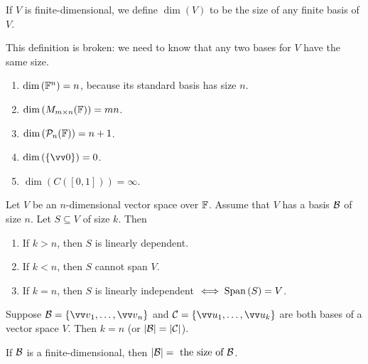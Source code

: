\begin{definition}
    If $V$ is finite-dimensional, we define $\dim{(V)}$ to be the size of any finite basis of $V$.
\end{definition}

\begin{note}
    This definition is broken: we need to know that any two bases for $V$ have the same size. \\
\end{note}

\begin{example}
    \phantom{}
    \begin{enumerate}
        \item $\dim{({\mathbb{F}}^n)} = n$, because its standard basis has size $n$.
        \item $\dim{(M_{m \times n}({\mathbb{F}}))} = mn$.
        \item $\dim{(\mathcal{P}_n({\mathbb{F}}))} = n+1$.
        \item $\dim{(\{\vzero\})} = 0$.
        \item $\dim{(C([0,1]))} = \infty$.
    \end{enumerate}
\end{example}

\begin{proposition}
    Let $V$ be an $n$-dimensional vector space over ${\mathbb{F}}$. Assume that $V$ has a basis $\mathcal{B}$ of size $n$. Let $S \subseteq V$ of size $k$.
    Then
    \begin{enumerate}[label=(\alph*)]
        \item If $k > n$, then $S$ is linearly dependent.
        \item If $k < n$, then $S$ cannot span $V$.
        \item If $k = n$, then $S$ is linearly independent $\iff \operatorname{Span}{(S)} = V$.
    \end{enumerate}
\end{proposition}

\begin{corollary}
    Suppose $\mB = \left\{\vvv_1, \ldots, \vvv_n\right\}$ and $\mC = \left\{\vvu_1, \ldots, \vvu_k\right\}$
    are both bases of a vector space $V$. Then $k = n$ (or $|\mathcal{B}| = |\mathcal{C}|$).
\end{corollary}

\begin{remark}
    If $\mathcal{B}$ is a finite-dimensional, then $|\mathcal{B}| = \text{ the size of $\mathcal{B}$}$.
\end{remark}

